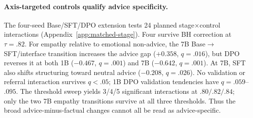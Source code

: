 \documentclass[11pt]{article}
\begin{document}
\begin{table}[t]
\centering
\small
\setlength{\tabcolsep}{3pt}
\caption{Change in the advice-minus-factual proxy gap across transitions
(plus-one-corrected prompt-clustered permutation tests, 10k draws; displayed
$q$ is BH-adjusted across all 28 adjacent-stage$\times$proxy tests). The
Base$\to$SFT column also changes the input serialization and is not a clean SFT
effect. Later raw $p\geq.168$.}
\label{tab:interaction}
\end{table}

\paragraph{Axis-targeted controls qualify advice specificity.} The four-seed
Base/SFT/DPO extension tests 24 planned stage$\times$control interactions
(Appendix~\ref{app:matched-stage}). Four survive BH correction at $\tau=.82$.
For empathy relative to emotional non-advice, the 7B Base$\to$SFT/interface
transition increases the advice gap
($+0.358$, $q=.016$), but DPO reverses it at both 1B ($-0.467$, $q=.001$) and
7B ($-0.642$, $q=.001$). At 7B, SFT also shifts structuring toward neutral
advice ($-0.208$, $q=.026$). No validation or referral interaction survives
$q<.05$; 1B DPO validation tendencies have $q=.059$--$.095$. The threshold
sweep yields 3/4/5 significant interactions at $.80/.82/.84$; only the two 7B
empathy transitions survive at all three thresholds. Thus the broad
advice-minus-factual changes cannot all be read as advice-specific.
\end{document}
